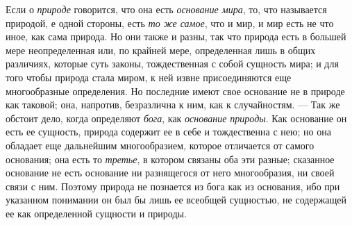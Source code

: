 Если о {\em природе} говорится, что она есть
{\em основание мира}, то, что называется природой, е
одной стороны, есть {\em то же самое}, что и мир, и мир
есть не что иное, как сама природа. Но они также и разны, так что природа
есть в большей мере неопределенная или, по крайней мере, определенная лишь
в общих различиях, которые суть законы, тождественная с собой сущность
мира; и для того чтобы природа стала миром, к ней извне присоединяются еще
многообразные определения. Но последние имеют свое основание не в природе
как таковой; она, напротив, безразлична к ним, как к случайностям. — Так же
обстоит дело, когда определяют {\em бога}, как
{\em основание природы}. Как основание он есть ее
сущность, природа содержит ее в себе и тождественна с нею; но она обладает
еще дальнейшим многообразием, которое отличается от самого основания; она
есть то {\em третье}, в котором связаны оба эти разные;
сказанное основание не есть основание ни разнящегося от него многообразия,
ни своей связи с ним. Поэтому природа не познается из бога как из
основания, ибо при указанном понимании он был бы лишь ее всеобщей
сущностью, не содержащей ее как определенной сущности и природы.

